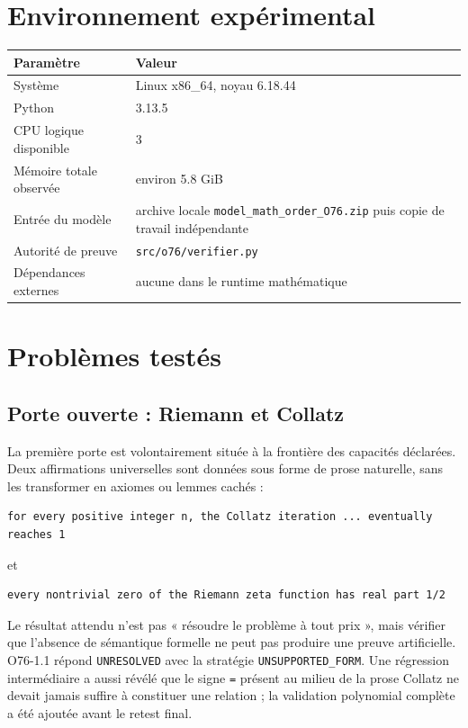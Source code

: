 \documentclass[11pt,a4paper]{article}
\newcommand{\Unresolved}{\texttt{UNRESOLVED}}
\begin{document}
\section{Environnement expérimental}
\begin{longtable}{p{}p{}}
\toprule
Paramètre & Valeur\\
\midrule
Système & Linux x86\_64, noyau 6.18.44\\
Python & 3.13.5\\
CPU logique disponible & 3\\
Mémoire totale observée & environ 5.8 GiB\\
Entrée du modèle & archive locale \texttt{model\_math\_order\_O76.zip} puis copie de travail indépendante\\
Autorité de preuve & \texttt{src/o76/verifier.py}\\
Dépendances externes & aucune dans le runtime mathématique\\
\bottomrule
\end{longtable}

\section{Problèmes testés}
\subsection{Porte ouverte : Riemann et Collatz}
La première porte est volontairement située à la frontière des capacités déclarées. Deux affirmations universelles sont données sous forme de prose naturelle, sans les transformer en axiomes ou lemmes cachés :
\begin{verbatim}
for every positive integer n, the Collatz iteration ... eventually reaches 1
\end{verbatim}
et
\begin{verbatim}
every nontrivial zero of the Riemann zeta function has real part 1/2
\end{verbatim}
Le résultat attendu n'est pas « résoudre le problème à tout prix », mais vérifier que l'absence de sémantique formelle ne peut pas produire une preuve artificielle. O76-1.1 répond \Unresolved{} avec la stratégie \texttt{UNSUPPORTED\_FORM}. Une régression intermédiaire a aussi révélé que le signe \texttt{=} présent au milieu de la prose Collatz ne devait jamais suffire à constituer une relation ; la validation polynomial complète a été ajoutée avant le retest final.
\end{document}
